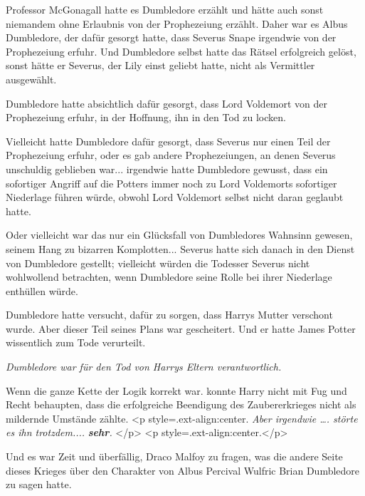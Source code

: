 Professor McGonagall hatte es Dumbledore erzählt und hätte auch sonst niemandem
ohne Erlaubnis von der Prophezeiung erzählt. Daher war es Albus Dumbledore, der
dafür gesorgt hatte, dass Severus Snape irgendwie von der Prophezeiung erfuhr.
Und Dumbledore selbst hatte das Rätsel erfolgreich gelöst, sonst hätte er
Severus, der Lily einst geliebt hatte, nicht als Vermittler ausgewählt.

Dumbledore hatte absichtlich dafür gesorgt, dass Lord Voldemort von der
Prophezeiung erfuhr, in der Hoffnung, ihn in den Tod zu locken.

Vielleicht hatte Dumbledore dafür gesorgt, dass Severus nur einen Teil der
Prophezeiung erfuhr, oder es gab andere Prophezeiungen, an denen Severus
unschuldig geblieben war... irgendwie hatte Dumbledore gewusst, dass ein
sofortiger Angriff auf die Potters immer noch zu Lord Voldemorts sofortiger
Niederlage führen würde, obwohl Lord Voldemort selbst nicht daran geglaubt
hatte.

Oder vielleicht war das nur ein Glücksfall von Dumbledores Wahnsinn gewesen,
seinem Hang zu bizarren Komplotten... Severus hatte sich danach in den Dienst
von Dumbledore gestellt; vielleicht würden die Todesser Severus nicht
wohlwollend betrachten, wenn Dumbledore seine Rolle bei ihrer Niederlage
enthüllen würde.

Dumbledore hatte versucht, dafür zu sorgen, dass Harrys Mutter verschont wurde.
Aber dieser Teil seines Plans war gescheitert. Und er hatte James Potter
wissentlich zum Tode verurteilt.

\emph{Dumbledore war für den Tod von Harrys Eltern verantwortlich.}

Wenn die ganze Kette der Logik korrekt war. konnte Harry nicht mit Fug und Recht
behaupten, dass die erfolgreiche Beendigung des Zaubererkrieges nicht als
mildernde Umstände zählte. <p style=\grqq{}.ext-align:center\grqq{}. \emph{ Aber
irgendwie …. störte es ihn trotzdem.... }\textbf{\emph{sehr}}\emph{. }</p> <p
style=\grqq{}.ext-align:center\grqq{}.</p>

Und es war Zeit und überfällig, Draco Malfoy zu fragen, was die andere Seite
dieses Krieges über den Charakter von Albus Percival Wulfric Brian Dumbledore zu
sagen hatte.

